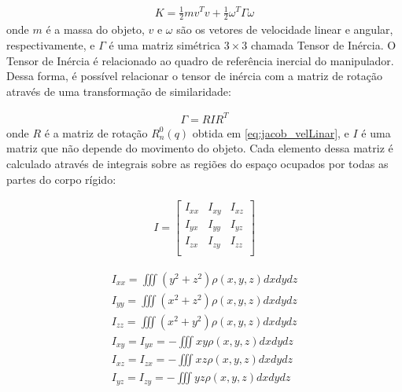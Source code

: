 \begin{equation}
  \begin{gathered}
    K=\frac{1}{2}mv^Tv+\frac{1}{2}\omega^T\Gamma \omega
  \end{gathered}
  \label{eq:energiaCinetica}
\end{equation}
onde $m$ é a massa do objeto, $v$ e $\omega$ são os vetores de velocidade 
linear e angular, respectivamente, e $\Gamma$ é uma matriz simétrica $3 \times 3$ 
chamada Tensor de Inércia. O Tensor de Inércia é relacionado ao quadro de 
referência inercial do manipulador. Dessa forma, é possível 
relacionar o tensor de inércia com a matriz de rotação através de uma 
transformação de similaridade:

\begin{equation}
  \begin{gathered}
    \Gamma = RIR^T
  \end{gathered}
  \label{eq:ts}
\end{equation}
onde $R$ é a matriz de rotação $R^{0}_n(q)$ obtida em \eqref{eq:jacob_velLinar}, e 
$I$ é uma matriz que não depende do movimento do objeto. 
Cada elemento dessa matriz é calculado através de integrais sobre as
regiões do espaço ocupados por todas as partes do corpo rígido:

\begin{equation}
  \begin{gathered}
    I = \begin{bmatrix}
     I_{xx} & I_{xy} & I_{xz}\\
     I_{yx} & I_{yy} & I_{yz}\\
     I_{zx} & I_{zy} & I_{zz}\\
    \end{bmatrix}
  \end{gathered}
\end{equation}

\begin{equation}
  \begin{gathered}
    I_{xx} = \iiint(y^2+z^2)\rho(x,y,z)dxdydz\\
    I_{yy} = \iiint(x^2+z^2)\rho(x,y,z)dxdydz\\
    I_{zz} = \iiint(x^2+y^2)\rho(x,y,z)dxdydz\\
    I_{xy} = I_{yx} = - \iiint xy\rho(x,y,z)dxdydz\\
    I_{xz} = I_{zx} = - \iiint xz\rho(x,y,z)dxdydz\\
    I_{yz} = I_{zy} = - \iiint yz\rho(x,y,z)dxdydz\\
  \end{gathered}
\end{equation}

